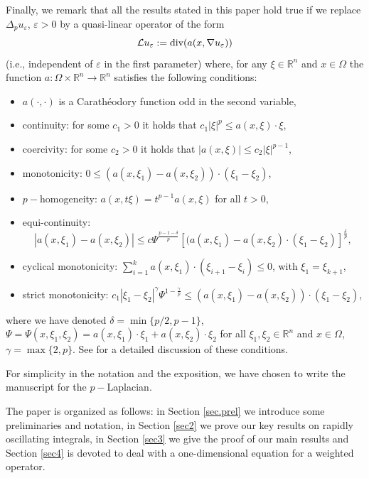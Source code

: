 \documentclass[12pt]{amsart}
\theoremstyle{definition}
\theoremstyle{remark}
\numberwithin{equation}{section}
\begin{document}
Finally, we remark that all the results stated in this paper hold true if we replace $\Delta_p u_\varepsilon$, $\varepsilon>0$ by a quasi-linear operator of the form
$$
\mathcal{L}u_\varepsilon :=\mathop{\text{\normalfont div}}(a(x,\nabla u_\varepsilon))
$$
(i.e., independent of $\varepsilon$ in the first parameter) where, for any $\xi\in\mathbb R^n$ and $x\in\Omega$ the function $a\colon \Omega\times\mathbb R^n\to \mathbb R^n$ satisfies the following conditions: 
\begin{itemize}
\item[$h_0$)] $a(\cdot,\cdot)$ is a Carath\'eodory function odd in the second variable,
\item[$h_1$)] continuity: for some $c_1>0$ it holds that $c_1|\xi|^p\leq a(x,\xi)\cdot \xi$,
\item[$h_2$)] coercivity: for some $c_2>0$ it holds that $|a(x,\xi)|\leq c_2|\xi|^{p-1}$,
\item[$h_3$)] monotonicity: $0\leq (a(x,\xi_1)-a(x,\xi_2))\cdot (\xi_1-\xi_2)$,
\item[$h_4$)] $p-$homogeneity: $a(x,t\xi)=t^{p-1}a(x,\xi)$ for all $t>0$,
\item[$h_5$)] equi-continuity: 
$$|a(x,\xi_1)-a(x,\xi_2)| \leq c\Psi^\frac{p-1-\delta}{p}[(a(x,\xi_1)-a(x,\xi_2)\cdot(\xi_1-\xi_2)]^\frac{\delta}{p},$$
\item[$h_6$)] cyclical monotonicity: $\sum_{i=1}^k a(x,\xi_1)\cdot (\xi_{i+1}-\xi_i)\leq 0$, with $\xi_1=\xi_{k+1}$,
\item[$h_7$)] strict monotonicity: $c_1|\xi_1-\xi_2|^\gamma\Psi^{1-\frac{\gamma}{p}} \leq (a(x,\xi_1)-a(x,\xi_2))\cdot (\xi_1-\xi_2)$,
\end{itemize} 
where we have denoted  $\delta=\min\{p/2,p-1\}$, $\Psi=\Psi(x,\xi_1,\xi_2)=a(x,\xi_1)\cdot\xi_1 + a(x,\xi_2)\cdot\xi_2$ for all  $\xi_1,\xi_2\in\mathbb R^n$ and $x\in\Omega$, $\gamma=\max\{2,p\}$. See \cite[Section 3.4]{BC} for  a detailed discussion of these conditions.

For simplicity in the notation and the exposition, we have chosen to write the manuscript for the $p-$Laplacian.

The paper is organized as follows: in Section \ref{sec.prel} we introduce some preliminaries and notation, in Section \ref{sec2} we prove our key results on rapidly oscillating integrals, in Section \ref{sec3} we give the proof of our main results and Section \ref{sec4} is devoted to deal with a one-dimensional equation for a  weighted operator.
 
\end{document}
